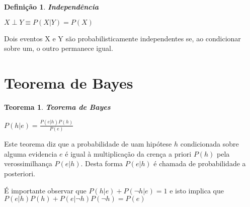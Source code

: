 \newtheorem{independence}[cond_prob]{Definição}
\begin{independence}
	\textbf{Independência}

	\centering	$X \perp Y \equiv P(X|Y) = P(X)$
\end{independence}
Dois eventos X e Y são probabilisticamente independentes se, ao condicionar sobre um, o outro permanece igual.

\section{Teorema de Bayes}
\newtheorem{bayes}{Teorema}[chapter]
\begin{bayes}
	\textbf{Teorema de Bayes}
	
	\centering $P(h|e) = \frac{P(e|h)P(h)}{P(e)}$
\end{bayes}
Este teorema diz que a probabilidade de uam hipótese $h$ condicionada sobre alguma evidencia $e$ é igual à multiplicação da crença a priori $P(h)$ pela verossimilhança $P(e|h)$. Desta forma $P(e|h)$ é chamada de probabilidade a posteriori.

É importante observar que $P(h|e)+P(\neg  h|e) = 1$ e isto implica que $P(e|h)P(h) +P(e|\neg h)P(\neg h)= P(e)$

